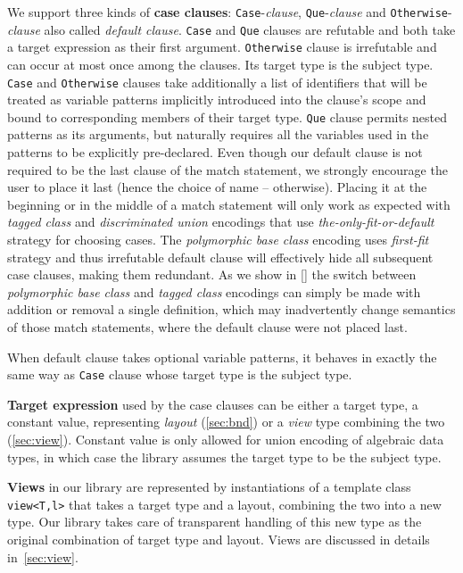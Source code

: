 \documentclass[preprint]{sigplanconf}
\makeatletter
\DeclareRobustCommand{\code}[1]{{\lstinline[breaklines=false,escapechar=@]{#1}}}
\makeatother
\begin{document}
We support three kinds of {\bf case clauses}: \code{Case}-\emph{clause}, 
\code{Que}-\emph{clause} and \code{Otherwise}-\emph{clause} also called 
\emph{default clause}. \code{Case} and \code{Que} clauses are refutable and both 
take a target expression as their first argument. \code{Otherwise} clause is 
irrefutable and can occur at most once among the clauses. Its target type is 
the subject type. \code{Case} and \code{Otherwise} clauses take additionally a 
list of identifiers that will be treated as variable patterns implicitly 
introduced into the clause's scope and bound to corresponding members of their 
target type. \code{Que} clause permits nested patterns as its arguments, but 
naturally requires all the variables used in the patterns to be explicitly 
pre-declared. Even though our default clause is not required to be the last 
clause of the match statement, we strongly encourage the user to place it 
last (hence the choice of name -- otherwise). Placing it at the beginning or in 
the middle of a match statement will only work as expected with \emph{tagged 
class} and \emph{discriminated union} encodings that use 
\emph{the-only-fit-or-default} strategy for choosing cases. The 
\emph{polymorphic base class} encoding uses \emph{first-fit} strategy and thus 
irrefutable default clause will effectively hide all subsequent case 
clauses, making them redundant. As we show in \textsection\ref{} the switch 
between \emph{polymorphic base class} and \emph{tagged class} encodings can 
simply be made with addition or removal a single definition, which may 
inadvertently change semantics of those match statements, where the default 
clause were not placed last.

When default clause takes optional variable patterns, it behaves in 
exactly the same way as \code{Case} clause whose target type is the subject 
type.

{\bf Target expression} used by the case clauses can be either a target type, 
a constant value, representing \emph{layout} (\textsection\ref{sec:bnd}) or a 
\emph{view} type combining the two (\textsection\ref{sec:view}). Constant value 
is only allowed for union encoding of algebraic data types, in which case the 
library assumes the target type to be the subject type.

{\bf Views} in our library are represented by instantiations of a template class 
\code{view<T,l>} that takes a target type and a layout, combining the two into a 
new type. Our library takes care of transparent handling of this new type as the 
original combination of target type and layout. Views are discussed in details 
in~\textsection\ref{sec:view}.
\end{document}
